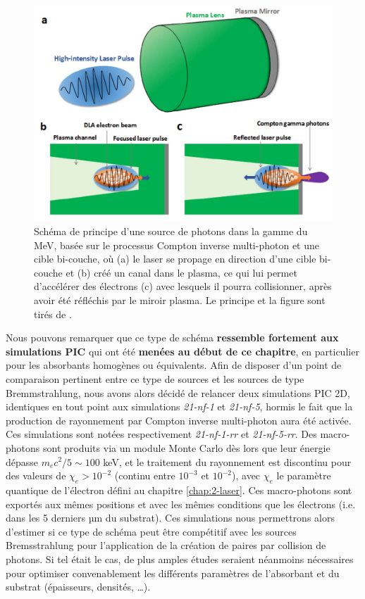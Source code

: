 \begin{refsection}
\begin{figure}[hbtp]
	\centering
	\includegraphics[width=0.7\linewidth]{6-opti_numerique/schema_Huang.png}
	\caption{Schéma de principe d'une source de photons dans la gamme du MeV, basée sur le processus Compton inverse multi-photon et une cible bi-couche, où (a) le laser se propage en direction d'une cible bi-couche et (b) créé un canal dans le plasma, ce qui lui permet d'accélérer des électrons (c) avec lesquels il pourra collisionner, après avoir été réfléchis par le miroir plasma. Le principe et la figure sont tirés de \parencite{huang_2019}.}
	\label{fig:63-schema_Huang}
\end{figure}

Nous pouvons remarquer que ce type de schéma \textbf{ressemble fortement aux simulations PIC} qui ont été \textbf{menées au début de ce chapitre}, en particulier pour les absorbants homogènes ou équivalents. Afin de disposer d'un point de comparaison pertinent entre ce type de sources et les sources de type Bremmstrahlung, nous avons alors décidé de relancer deux simulations PIC 2D, identiques en tout point aux simulations \textit{21-nf-1} et \textit{21-nf-5}, hormis le fait que la production de rayonnement par Compton inverse multi-photon aura été activée. Ces simulations sont notées respectivement \textit{21-nf-1-rr} et \textit{21-nf-5-rr}. Des macro-photons sont produits via un module Monte Carlo dès lors que leur énergie dépasse $m_e c^2/5 \sim 100$ keV, et le traitement du rayonnement est discontinu pour des valeurs de $\chi_e > 10^{-2}$ (continu entre $10^{-3}$ et $10^{-2}$), avec $\chi_e$ le paramètre quantique de l'électron défini au chapitre \ref{chap:2-laser}. Ces macro-photons sont exportés aux mêmes positions et avec les mêmes conditions que les électrons (i.e. dans les 5 derniers µm du substrat). Ces simulations nous permettrons alors d'estimer si ce type de schéma peut être compétitif avec les sources Bremsstrahlung pour l'application de la création de paires par collision de photons. Si tel était le cas, de plus amples études seraient néanmoins nécessaires pour optimiser convenablement les différents paramètres de l'absorbant et du substrat (épaisseurs, densités, …). 


\end{refsection}

